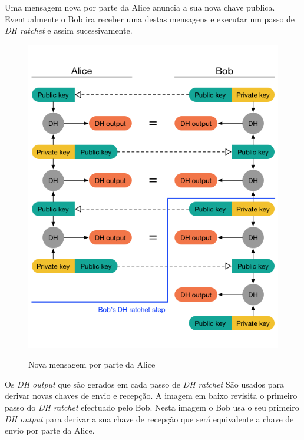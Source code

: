 Uma mensagem nova por parte da Alice anuncia a sua nova chave publica. Eventualmente o Bob ira receber uma destas mensagens e executar um passo de \textit{DH ratchet} e assim sucessivamente.

\begin{figure}[H]
\begin{center}
\includegraphics[width=12cm]{img/DH4.png}
\label{diagram:DH4}
\caption{Nova mensagem por parte da Alice}
\centering
\end{center}
\end{figure}

Os \textit{DH output} que são gerados em cada passo de \textit{DH ratchet} São usados para derivar novas chaves de envio e recepção. A imagem em baixo revisita o primeiro passo do \textit{DH ratchet} efectuado pelo Bob. Nesta imagem o Bob usa o seu primeiro \textit{DH output} para derivar a sua chave de recepção que será equivalente a chave de envio por parte da Alice.

